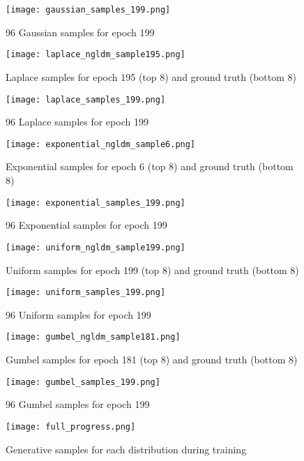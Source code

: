 \documentclass[10pt,twocolumn,letterpaper]{article}
\begin{document}
\begin{figure*}
  \centering
  \texttt{[image: gaussian\_samples\_199.png]}
  \caption{96 Gaussian samples for epoch 199}
  \hfill
\end{figure*}

\begin{figure*}
  \centering
  \texttt{[image: laplace\_ngldm\_sample195.png]}
  \caption{Laplace samples for epoch 195 (top 8) and ground truth (bottom 8)}
  \hfill
\end{figure*}

\begin{figure*}
  \centering
  \texttt{[image: laplace\_samples\_199.png]}
  \caption{96 Laplace samples for epoch 199}
  \hfill
\end{figure*}

\begin{figure*}
  \centering
  \texttt{[image: exponential\_ngldm\_sample6.png]}
  \caption{Exponential samples for epoch 6 (top 8) and ground truth (bottom 8)}
  \hfill
\end{figure*}

\begin{figure*}
  \centering
  \texttt{[image: exponential\_samples\_199.png]}
  \caption{96 Exponential samples for epoch 199}
  \hfill
\end{figure*}

\begin{figure*}
  \centering
  \texttt{[image: uniform\_ngldm\_sample199.png]}
  \caption{Uniform samples for epoch 199 (top 8) and ground truth (bottom 8)}
  \hfill
\end{figure*}

\begin{figure*}
  \centering
  \texttt{[image: uniform\_samples\_199.png]}
  \caption{96 Uniform samples for epoch 199}
  \hfill
\end{figure*}

\begin{figure*}
  \centering
  \texttt{[image: gumbel\_ngldm\_sample181.png]}
  \caption{Gumbel samples for epoch 181 (top 8) and ground truth (bottom 8)}
  \hfill
\end{figure*}

\begin{figure*}
  \centering
  \texttt{[image: gumbel\_samples\_199.png]}
  \caption{96 Gumbel samples for epoch 199}
  \hfill
\end{figure*}

\begin{figure*}
  \centering
  \texttt{[image: full\_progress.png]}
  \caption{Generative samples for each distribution during training}
  \hfill
\end{figure*}
\end{document}
